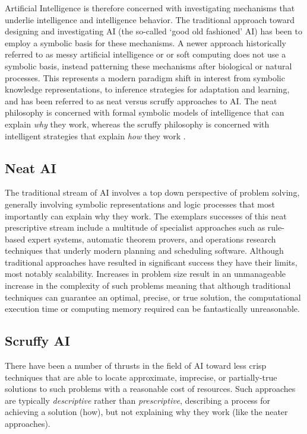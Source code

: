 \documentclass[a4paper, 11pt]{article}
\begin{document}
Artificial Intelligence is therefore concerned with investigating mechanisms that underlie intelligence and intelligence behavior. The traditional approach toward designing and investigating AI (the so-called `good old fashioned' AI) has been to employ a symbolic basis for these mechanisms. A newer approach historically referred to as messy artificial intelligence or or soft computing does not use a symbolic basis, instead patterning these mechanisms after biological or natural processes. This represents a modern paradigm shift in interest from symbolic knowledge representations, to inference strategies for adaptation and learning, and has been referred to as neat versus scruffy approaches to AI. The neat philosophy is concerned with formal symbolic models of intelligence that can explain \emph{why} they work, whereas the scruffy philosophy is concerned with intelligent strategies that explain \emph{how} they work \cite{Sloman1990}.

\subsection{Neat AI}
The traditional stream of AI involves a top down perspective of problem solving, generally involving symbolic representations and logic processes that most importantly can explain why they work. The exemplars successes of this neat prescriptive stream include a multitude of specialist approaches such as rule-based expert systems, automatic theorem provers, and operations research techniques that underly modern planning and scheduling software. Although traditional approaches have resulted in significant success they have their limits, most notably scalability. Increases in problem size result in an unmanageable increase in the complexity of such problems meaning that although traditional techniques can guarantee an optimal, precise, or true solution, the computational execution time or computing memory required can be fantastically unreasonable.

\subsection{Scruffy AI}
There have been a number of thrusts in the field of AI toward less crisp techniques that are able to locate approximate, imprecise, or partially-true solutions to such problems with a reasonable cost of resources. Such approaches are typically \emph{descriptive} rather than \emph{prescriptive}, describing a process for achieving a solution (how), but not explaining why they work (like the neater approaches). 
\end{document}
